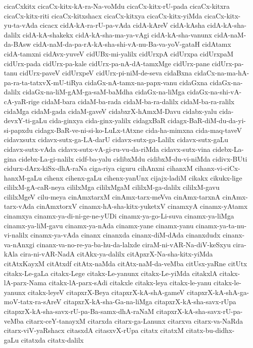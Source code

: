 {cicaCxkitx
cicaCx-kitx-kA-ra-Na-voMdu
cicaCx-kitx-rU-pada
cicaCx-kitxra
cicaCx-kitx-riti
cicaCx-kitxshacx
cicaCx-kitxya
cicaCx-kitx-yiMda
cicaCx-kitx-yu-ta-vAda
cicacx
cidA-kA-ra-rU-pa-vAda
cidA-kAreV
cidA-kAsha
cidA-kA-sha-dalilx
cidA-kA-shakekx
cidA-kA-sha-ma-ya-vAgi
cidA-kA-sha-vanunx
cidA-naM-da-BAsw
cidA-naM-da-pa-rA-kA-sha-shi-vA-nu-Ba-va-yoV-gataH
cidAtamx
cidA-tamxni
cidAvx-yuveV
cidUBx-mi-yalilx
cidUrxpA
cidUrxpa
cidUrxpaM
cidUrx-pada
cidUrx-pa-kale
cidUrx-pa-nA-dA-tamxMge
cidUrx-pane
cidUrx-pa-tanu
cidUrx-paveV
cidUrxpeV
cidUrx-pi-niM-de-seva
cidaBxna
cidaCx-na-ma-hA-pa-ra-ta-tatxvX-mU-tiRya
cidaGx-nA-tamx-na-papx-vanu
cidaGxna
cidaGx-na-dalilx
cidaGx-na-liM-gAM-ga-saM-baMdha
cidaGx-na-liMga
cidaGx-na-shi-vA-cA-yaR-rige
cidaM-bara
cidaM-ba-rada
cidaM-ba-ra-dalilx
cidaM-ba-ra-ralilx
cidaMga
cidaM-gada
cidaM-gaveV
cidabxrX-hAmxM-Davu
cidabx-yalu
cida-devxY-ti-gaLu
cida-ginxya
cida-ginx-yalilx
cidagxBaR
cidagx-BaR-diM-du-da-yi-si-papxdu
cidagx-BaR-ve-ni-si-ko-LuLx-tAtxne
cida-ha-mimxna
cida-maq-taveV
cidavxsutx
cidavx-sutx-ga-LA-darU
cidavx-sutx-ga-Lalilx
cidavx-sutx-gaLu
cidavx-sutx-vAda
cidavx-sutx-vA-gi-ru-vu-da-riMda
cidavx-sutx-vina
cidebx-La-gina
cidebx-La-gi-nalilx
cidf-ba-yalu
cidibxMdu
cidibxM-du-vi-niMda
cidivx-BUti
cidurx-dArx-kiSx-dhA-raNa
ciga-riya
ciguru
cihAnxni
cihanxM
cihanx-vi-ciCx-hanxM-gaLu
cihenx
cihenx-gaLu
cihenx-yanUnx
cijajx-ladiM
cikakx
cikukx-lige
cililxM-gA-caR-neya
cililxMga
cililxMgaM
cililxM-ga-dalilx
cililxM-gavu
cililxMgeV
cilu-meya
cinAmxtarxM
cinAmx-tarx-meVva
cinAmx-tarxnA
cinAmx-tarx-vAda
cinAmxtorxV
cinamx-hA-sha-kitx-yuketxV
cinamxyA
cinamx-yAtamx
cinamxya
cinamx-ya-di-ni-ge-ne-yUDi
cinamx-ya-go-Li-suva
cinamx-ya-liMga
cinamx-ya-liM-gavu
cinamx-ya-nAda
cinamx-yane
cinamx-yanu
cinamx-ya-ta-nu-vi-nalilx
cinamx-ya-vAda
cinanx
cinanxda
cinanx-diM-dAda
cinanxdudx
cinanx-va-nAnxgi
cinanx-va-no-re-ya-ba-hu-da-lalxde
ciraM-ni-vAR-Na-diV-keSxyu
cira-kAla
cira-ni-vAR-NadA
citAkx-ya-dalilx
citApxrX-Na-sha-kitx-yiMda
citAtxKayxM
citAtxdf
citAtx-naMda
citAtx-naM-da-veMba
citUsx-yaRne
citUtx
citakx-Le-gaLa
citakx-Lege
citakx-Le-yanunx
citakx-Le-yiMda
citakxlA
citakx-lA-parx-Nama
citakx-lA-parx-sAdi
citakxle
citakx-leya
citakx-le-yanu
citakx-le-yanunx
citakx-leyeV
citapxrX-Beya
citapxrX-kA-shA-gameV
citapxrX-kA-shA-ga-moV-tatx-ra-sAreV
citapxrX-kA-sha-Ga-na-liMga
citapxrX-kA-sha-savx-rUpa
citapxrX-kA-sha-savx-rU-pa-Ba-samx-dhA-raNaM
citapxrX-kA-sha-savx-rU-pa-veMba
citarx-ceY-tanayxM
citarxda
citarx-ga-Lanunx
citarxva
citarx-va-NaRda
citarx-viV-yaRshacx
citasxdA
citasxvX-rUpa
citatx
citatxM
citatx-bu-didhx-gaLu
citatxda
citatx-dalilx
}
